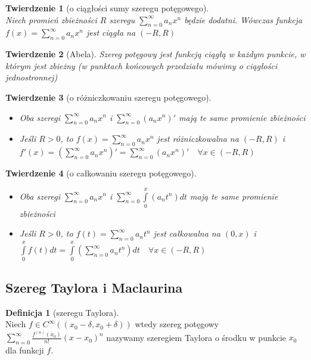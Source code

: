 \documentclass[12pt,a4paper]{article}
\newtheorem{tw}{Twierdzenie}
\theoremstyle{definition}
\newtheorem{df}{Definicja}
\begin{document}
\begin{tw}[o ciągłości sumy szeregu potęgowego]~\\
Niech promień zbieżności $R$ szeregu $\sum\limits_{n=0}^\infty a_nx^n$ będzie dodatni. Wówczas funkcja $f(x)=\sum\limits_{n=0}^\infty a_nx^n$ jest ciągła na $(-R, R)$
\end{tw}

\begin{tw}[Abela]
Szereg potęgowy jest funkcją ciągłą w każdym punkcie, w którym jest zbieżny (w punktach końcowych przedziału mówimy o ciągłości jednostronnej) 
\end{tw}

\begin{tw}[o różniczkowaniu szeregu potęgowego]~\\
\begin{itemize}
	\item Oba szeregi $\sum\limits_{n=0}^\infty a_nx^n$ i $\sum\limits_{n=0}^\infty (a_nx^n)'$ mają te same promienie zbieżności
	\item Jeśli $R > 0$, to $f(x) = \sum\limits_{n=0}^\infty a_nx^n$ jest różniczkowalna na $(-R, R)$ i $f'(x) = (\sum\limits_{n=0}^\infty a_nx^n)' = \sum\limits_{n=0}^\infty (a_nx^n)' \quad \forall x\in (-R,R)$
\end{itemize}
\end{tw}

\begin{tw}[o całkowaniu szeregu potęgowego]~\\
\begin{itemize}
	\item Oba szeregi $\sum\limits_{n=0}^\infty a_nx^n$ i $\sum\limits_{n=0}^\infty \int\limits_0^x (a_nt^n)dt$ mają te same promienie zbieżności
	\item Jeśli $R > 0$, to $f(t) = \sum\limits_{n=0}^\infty a_nt^n$ jest całkowalna na $(0, x)$ i $\int\limits_0^x f(t)dt = \int\limits_0^x(\sum\limits_{n=0}^\infty a_nt^n)dt \quad \forall x\in (-R,R)$
\end{itemize}
\end{tw}

\subsection{Szereg Taylora i Maclaurina}
\begin{df}[szeregu Taylora]~\\
Niech $f\in C^\infty ((x_0-\delta, x_0+\delta))$ wtedy szereg potęgowy $\sum\limits_{n=0}^\infty \frac{f^{(n)}(x_0)}{n!}(x-x_0)^n$ nazywamy szeregiem Taylora o środku w punkcie $x_0$ dla funkcji $f$.
\end{df}
\end{document}
